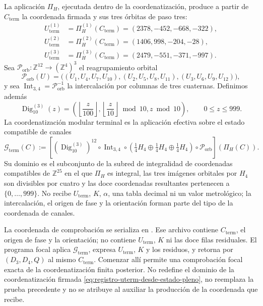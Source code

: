 La aplicación \(\Pi_H\), ejecutada dentro de la coordenatización, produce a partir de
\(C_{\mathrm{term}}\) la coordenada firmada y sus tres órbitas de paso tres:
\begin{align*}
 U_{\mathrm{term}}^{(1)}&=\Pi_H^{(1)}(C_{\mathrm{term}})
                         =(2378,-452,-668,-322),\\
 U_{\mathrm{term}}^{(2)}&=\Pi_H^{(2)}(C_{\mathrm{term}})
                         =(1406,998,-204,-28),\\
 U_{\mathrm{term}}^{(3)}&=\Pi_H^{(3)}(C_{\mathrm{term}})
                         =(2479,-551,-371,-997).
\end{align*}
Sea \(\mathcal P_{\mathrm{orb}}:\mathbb Z^{12}\to(\mathbb Z^4)^3\) el
reagrupamiento orbital
\[
 \mathcal P_{\mathrm{orb}}(U)
 =\bigl((U_1,U_4,U_7,U_{10}),
        (U_2,U_5,U_8,U_{11}),
        (U_3,U_6,U_9,U_{12})\bigr),
\]
y sea \(\operatorname{Int}_{3,4}=\mathcal P_{\mathrm{orb}}^{-1}\) la
intercalación por columnas de tres cuaternas. Definimos además
\[
 \operatorname{Dig}_{10}^{(3)}(z)
 =\left(\left\lfloor\frac z{100}\right\rfloor,
         \left\lfloor\frac z{10}\right\rfloor\bmod10,
         z\bmod10\right),\qquad0\le z\le999.
\]
La coordenatización modular terminal es la aplicación efectiva sobre el estado compatible
de canales
\begin{equation}
 \mathcal G_{\mathrm{term}}(C)
 :=\left[(\operatorname{Dig}_{10}^{(3)})^{12}
 \circ\operatorname{Int}_{3,4}
 \circ\left(\tfrac14H_4\oplus\tfrac14H_4
                    \oplus\tfrac14H_4\right)
  \circ\mathcal P_{\mathrm{orb}}\right]\!\left(\Pi_H(C)\right).
 \label{eq:registro-generador-modular-terminal}
\end{equation}
Su dominio es el subconjunto de la subred de integralidad de coordenadas
compatibles de \(\mathbb Z^{25}\)
en el que \(\Pi_H\) es integral, las tres imágenes orbitales por \(H_4\) son
divisibles por cuatro y las doce coordenadas resultantes pertenecen a
\(\{0,\ldots,999\}\). No recibe \(U_{\mathrm{term}}\), \(K\), \(\alpha\),
una tabla decimal ni un valor metrológico; la intercalación, el origen de fase
y la orientación forman parte del tipo de la coordenada de canales.

La coordenada de comprobación se serializa en
. Ese archivo contiene
\(C_{\mathrm{term}}\), el origen de fase y la orientación; no contiene
\(U_{\mathrm{term}}\), \(K\) ni las doce filas residuales. El programa focal
aplica \(\mathcal G_{\mathrm{term}}\), expresa \(U_{\mathrm{term}}\), \(K\) y
los residuos, y retorna por \((D_3,D_4,Q)\) al mismo
\(C_{\mathrm{term}}\). Comenzar allí permite una comprobación focal exacta
de la coordenatización finita posterior. No redefine el dominio de la coordenatización firmada
\eqref{eq:registro-uterm-desde-estado-pleno}, no reemplaza la prueba precedente y no
se atribuye al auxiliar la producción de la coordenada que recibe.

